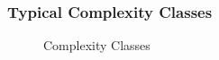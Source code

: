 \begin{frame}
 \frametitle{Typical Complexity Classes}
 \begin{figure}
  \caption{Complexity Classes}
 \end{figure}
\end{frame}

